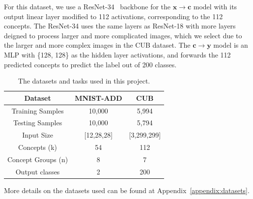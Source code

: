 For this dataset, we use a ResNet-34~\cite{resnet} backbone for the 
$\mathbf{x} \to \mathbf{c}$
model with its output linear layer modified to 112 activations, corresponding
to the 112 concepts. The ResNet-34 uses the same layers as ResNet-18
with more layers deigned to process larger and more complicated images,
which we select due to the larger and more complex images in the CUB dataset.
The $\mathbf{c} \to \mathbf{y}$ model is an MLP with \{128, 128\} as the hidden
layer activations, and forwards the 112 predicted concepts to predict the label out of 200 classes.


\begin{table}
    \centering
    \renewcommand{\arraystretch}{1.5}
    \begin{tabular}{c|cc}

    Dataset & MNIST-ADD & CUB \\
    \hline
    Training Samples & 10,000 & 5,994 \\
    Testing Samples & 10,000 & 5,794 \\
    Input Size & [12,28,28] & [3,299,299]\\
    Concepts (k) & 54 & 112 \\
    Concept Groups (n) & 8 & 7 \\
    Output classes & 2 & 200
    \end{tabular}
    \caption{The datasets and tasks used in this project.}
    \label{table:datasets}
\end{table}

More details on the datasets used can be found at Appendix~\ref{appendix:datasets}.



